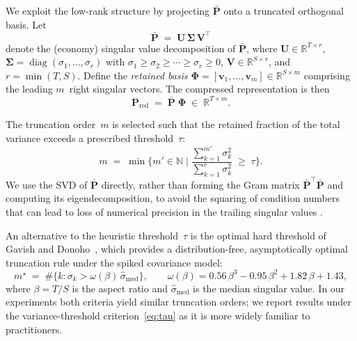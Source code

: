 \documentclass[11pt,a4paper]{article}
\newcommand{\R}{\mathbb{R}}
\newcommand{\N}{\mathbb{N}}
\newcommand{\bP}{\bm{P}}
\newcommand{\bPhi}{\bm{\Phi}}
\begin{document}
We exploit the low-rank structure by projecting $\bar{\bP}$ onto a truncated
orthogonal basis.  Let
%
\begin{equation}\label{eq:svd}
  \bar{\bP}
  \;=\;
  \bm{U}\,\bm{\Sigma}\,\bm{V}^\top
\end{equation}
%
denote the (economy) singular value decomposition of $\bar{\bP}$, where
$\bm{U} \in \R^{T \times r}$, $\bm{\Sigma} = \operatorname{diag}(\sigma_1,
\dotsc,\sigma_r)$ with $\sigma_1 \geq \sigma_2 \geq \dotsb \geq \sigma_r
\geq 0$, $\bm{V} \in \R^{S \times r}$, and $r = \min(T,S)$.  Define the
\emph{retained basis} $\bPhi = [\bm{v}_1,\dotsc,\bm{v}_m] \in \R^{S
\times m}$ comprising the leading $m$~right singular vectors.  The compressed
representation is then
%
\begin{equation}\label{eq:projection}
  \bP_{\mathrm{red}}
  \;=\;
  \bar{\bP}\;\bPhi
  \;\in\; \R^{T \times m}.
\end{equation}

The truncation order~$m$ is selected such that the retained fraction of the
total variance exceeds a prescribed threshold~$\tau$:
%
\begin{equation}\label{eq:tau}
  m
  \;=\;
  \min\biggl\{
    m' \in \N
    \;\bigg|\;
    \frac{\displaystyle\sum_{k=1}^{m'} \sigma_k^2}
         {\displaystyle\sum_{k=1}^{r}   \sigma_k^2}
    \;\geq\; \tau
  \biggr\}.
\end{equation}
%
We use the SVD of $\bar{\bP}$ directly, rather than forming the Gram matrix
$\bar{\bP}^\top\!\bar{\bP}$ and computing its eigendecomposition, to avoid
the squaring of condition numbers that can lead to loss of numerical precision
in the trailing singular values \cite{golub2013matrix}.

An alternative to the heuristic threshold~$\tau$ is the optimal hard threshold
of Gavish and Donoho~\cite{gavish2014optimal}, which provides a
distribution-free, asymptotically optimal truncation rule under the spiked
covariance model:
%
\begin{equation}\label{eq:gavish}
  m^{\star}
  \;=\;
  \#\bigl\{
    k : \sigma_k > \omega(\beta)\,\hat{\sigma}_{\mathrm{med}}
  \bigr\},
  \qquad
  \omega(\beta) = 0.56\,\beta^3 - 0.95\,\beta^2 + 1.82\,\beta + 1.43,
\end{equation}
%
where $\beta = T/S$ is the aspect ratio and
$\hat{\sigma}_{\mathrm{med}}$ is the median singular value.  In our
experiments both criteria yield similar truncation orders; we report results
under the variance-threshold criterion~\eqref{eq:tau} as it is more widely
familiar to practitioners.
\end{document}
